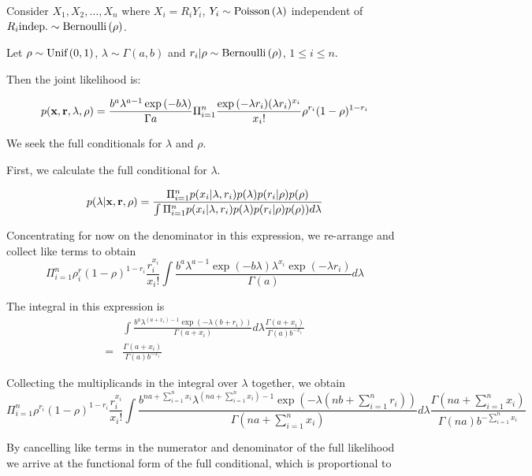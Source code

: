 \documentclass{amsart}
\begin{document}
Consider $X_1, X_2, \ldots, X_n$ where $X_i = R_i Y_i$, $Y_i \sim \text{Poisson} \left( \lambda \right)$ independent of
$R_i \text{indep.} \sim \text{Bernoulli} \left( \rho \right)$.

Let $\rho \sim \text{Unif} \left( 0, 1 \right)$, $\lambda \sim \Gamma(a, b)$ and $r_i | \rho \sim \text{Bernoulli} \left( \rho \right)$, $1 \leq i \leq n$.

Then the joint likelihood is:

$$
p(\textbf{x}, \textbf{r}, \lambda, \rho) = \frac{b^a \lambda^{a - 1} \exp{(-b \lambda)}}{\Gamma{a}} \Pi_{i=1}^n \frac{\exp{(-\lambda r_i)} (\lambda r_i)^{x_i}}{x_i !} \rho^{r_i} (1 - \rho)^{1 - r_i}
$$

We seek the full conditionals for $\lambda$ and $\rho$.

First, we calculate the full conditional for $\lambda$.

\begin{align*}
p(\lambda|\textbf{x}, \textbf{r}, \rho) &= \frac{\Pi_{i=1}^n p(x_i | \lambda, r_i) p(\lambda) p(r_i|\rho) p(\rho)}{\int \Pi_{i=1}^n p(x_i | \lambda, r_i) p(\lambda) p(r_i|\rho) p(\rho)) d \lambda} \\
\end{align*}

Concentrating for now on the denominator in this expression, we re-arrange and collect
like terms to obtain
$$
\Pi_{i=1}^n \rho^r_i (1 - \rho)^{1 - r_i} \frac{r_i^{x_i}}{x_i !}
	\int \frac{b^a \lambda^{a - 1} \exp{(-b \lambda)} \lambda^{x_i} \exp{(-\lambda r_i)}}{\Gamma{(a)}} d \lambda
$$

The integral in this expression is
\begin{align*}
& \int \frac{b^a \lambda^{(a + x_i) - 1} \exp{(-\lambda(b + r_i))}}{\Gamma{(a + x_i)}} d \lambda \frac{\Gamma{(a+ x_i)}}{\Gamma{(a)} b^{-x_i}} \\
=& \frac{\Gamma{(a+ x_i)}}{\Gamma{(a)} b^{-x_i}}
\end{align*}

Collecting the multiplicands in the integral over $\lambda$ together, we obtain
$$
\Pi_{i=1}^n \rho^{r_i} (1 - \rho)^{1 - r_i} \frac{r_i^{x_i}}{x_i!}
	\int \frac{b^{na + \sum_{i=1}^n x_i} \lambda^{(na + \sum_{i=1}^n x_i) - 1} \exp{(-\lambda(nb + \sum_{i=1}^n r_i))}}{\Gamma{(na + \sum_{i=1}^n x_i)}} d \lambda
	\frac{\Gamma{(na + \sum_{i=1}^n x_i)}}{\Gamma{(na)} b^{-\sum_{i=1}^n x_i}}
$$

By cancelling like terms in the numerator and denominator of the full likelihood we arrive 
at the functional form of the full conditional, which is proportional to
\end{document}
